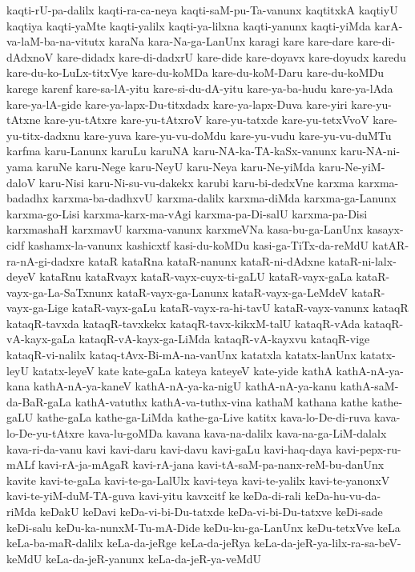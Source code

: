 {kaqti-rU-pa-dalilx
kaqti-ra-ca-neya
kaqti-saM-pu-Ta-vanunx
kaqtitxkA
kaqtiyU
kaqtiya
kaqti-yaMte
kaqti-yalilx
kaqti-ya-lilxna
kaqti-yanunx
kaqti-yiMda
karA-va-laM-ba-na-vitutx
karaNa
kara-Na-ga-LanUnx
karagi
kare
kare-dare
kare-di-dAdxnoV
kare-didadx
kare-di-dadxrU
kare-dide
kare-doyavx
kare-doyudx
karedu
kare-du-ko-LuLx-titxVye
kare-du-koMDa
kare-du-koM-Daru
kare-du-koMDu
karege
karenf
kare-sa-lA-yitu
kare-si-du-dA-yitu
kare-ya-ba-hudu
kare-ya-lAda
kare-ya-lA-gide
kare-ya-lapx-Du-titxdadx
kare-ya-lapx-Duva
kare-yiri
kare-yu-tAtxne
kare-yu-tAtxre
kare-yu-tAtxroV
kare-yu-tatxde
kare-yu-tetxVvoV
kare-yu-titx-dadxnu
kare-yuva
kare-yu-vu-doMdu
kare-yu-vudu
kare-yu-vu-duMTu
karfma
karu-Lanunx
karuLu
karuNA
karu-NA-ka-TA-kaSx-vanunx
karu-NA-ni-yama
karuNe
karu-Nege
karu-NeyU
karu-Neya
karu-Ne-yiMda
karu-Ne-yiM-daloV
karu-Nisi
karu-Ni-su-vu-dakekx
karubi
karu-bi-dedxVne
karxma
karxma-badadhx
karxma-ba-dadhxvU
karxma-dalilx
karxma-diMda
karxma-ga-Lanunx
karxma-go-Lisi
karxma-karx-ma-vAgi
karxma-pa-Di-salU
karxma-pa-Disi
karxmashaH
karxmavU
karxma-vanunx
karxmeVNa
kasa-bu-ga-LanUnx
kasayx-cidf
kashamx-la-vanunx
kashicxtf
kasi-du-koMDu
kasi-ga-TiTx-da-reMdU
katAR-ra-nA-gi-dadxre
kataR
kataRna
kataR-nanunx
kataR-ni-dAdxne
kataR-ni-lalx-deyeV
kataRnu
kataRvayx
kataR-vayx-cuyx-ti-gaLU
kataR-vayx-gaLa
kataR-vayx-ga-La-SaTxnunx
kataR-vayx-ga-Lanunx
kataR-vayx-ga-LeMdeV
kataR-vayx-ga-Lige
kataR-vayx-gaLu
kataR-vayx-ra-hi-tavU
kataR-vayx-vanunx
kataqR
kataqR-tavxda
kataqR-tavxkekx
kataqR-tavx-kikxM-talU
kataqR-vAda
kataqR-vA-kayx-gaLa
kataqR-vA-kayx-ga-LiMda
kataqR-vA-kayxvu
kataqR-vige
kataqR-vi-nalilx
kataq-tAvx-Bi-mA-na-vanUnx
katatxla
katatx-lanUnx
katatx-leyU
katatx-leyeV
kate
kate-gaLa
kateya
kateyeV
kate-yide
kathA
kathA-nA-ya-kana
kathA-nA-ya-kaneV
kathA-nA-ya-ka-nigU
kathA-nA-ya-kanu
kathA-saM-da-BaR-gaLa
kathA-vatuthx
kathA-va-tuthx-vina
kathaM
kathana
kathe
kathe-gaLU
kathe-gaLa
kathe-ga-LiMda
kathe-ga-Live
katitx
kava-lo-De-di-ruva
kava-lo-De-yu-tAtxre
kava-lu-goMDa
kavana
kava-na-dalilx
kava-na-ga-LiM-dalalx
kava-ri-da-vanu
kavi
kavi-daru
kavi-davu
kavi-gaLu
kavi-haq-daya
kavi-pepx-ru-mALf
kavi-rA-ja-mAgaR
kavi-rA-jana
kavi-tA-saM-pa-nanx-reM-bu-danUnx
kavite
kavi-te-gaLa
kavi-te-ga-LalUlx
kavi-teya
kavi-te-yalilx
kavi-te-yanonxV
kavi-te-yiM-duM-TA-guva
kavi-yitu
kavxcitf
ke
keDa-di-rali
keDa-hu-vu-da-riMda
keDakU
keDavi
keDa-vi-bi-Du-tatxde
keDa-vi-bi-Du-tatxve
keDi-sade
keDi-salu
keDu-ka-nunxM-Tu-mA-Dide
keDu-ku-ga-LanUnx
keDu-tetxVve
keLa
keLa-ba-maR-dalilx
keLa-da-jeRge
keLa-da-jeRya
keLa-da-jeR-ya-lilx-ra-sa-beV-keMdU
keLa-da-jeR-yanunx
keLa-da-jeR-ya-veMdU
}
